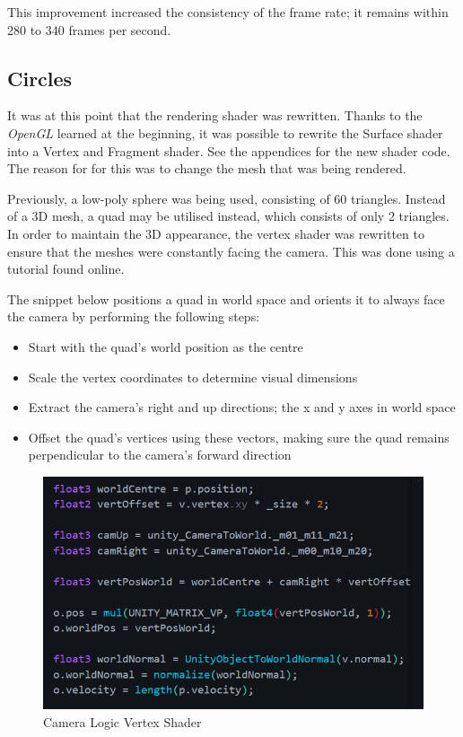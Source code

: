 \documentclass[12pt]{article}
\begin{document}
    This improvement increased the consistency of the frame rate; it remains within 280 to 340 frames per second.

    \subsection{Circles}

    It was at this point that the rendering shader was rewritten. Thanks to the \textit{OpenGL} learned at the beginning, it was possible to rewrite the Surface shader into a Vertex and Fragment shader. See the appendices for the new shader code. The reason for for this was to change the mesh that was being rendered. 
    
    Previously, a low-poly sphere was being used, consisting of 60 triangles. Instead of a 3D mesh, a quad may be utilised instead, which consists of only 2 triangles. In order to maintain the 3D appearance, the vertex shader was rewritten to ensure that the meshes were constantly facing the camera. This was done using a tutorial found online\cite{lague2}.

    The snippet below positions a quad in world space and orients it to always face the camera by performing the following steps:
    \begin{itemize}
        \item Start with the quad's world position as the centre
        \item Scale the vertex coordinates to determine visual dimensions
        \item Extract the camera's right and up directions; the x and y axes in world space
        \item Offset the quad's vertices using these vectors, making sure the quad remains perpendicular to the camera's forward direction
    \end{itemize}

    \begin{figure}[H]
        \begin{center}
            \includegraphics[]{cameraLogic.png}
            \caption{Camera Logic Vertex Shader \cite{lague2}}
        \end{center}
    \end{figure}
\end{document}

